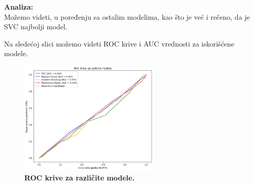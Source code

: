 \documentclass{article}
\begin{document}
\begin{flushleft}
\textbf{Analiza:}\\

Možemo videti, u poređenju sa ostalim modelima, kao što je već i rečeno, da je SVC najbolji model.
\end{flushleft}


\newpage
\begin{flushleft}

Na sledećoj slici možemo videti ROC krive i AUC vrednosti za iskorišćene modele.
\end{flushleft}

\begin{figure}[ht]
    \centering
    \includegraphics[width=0.6\textwidth]{modeliROC.png}
    \captionsetup{labelformat=empty}
    \caption{\textbf{ROC krive za različite modele.}}
    \label{fig:nedostajuce}
\end{figure}
\end{document}
